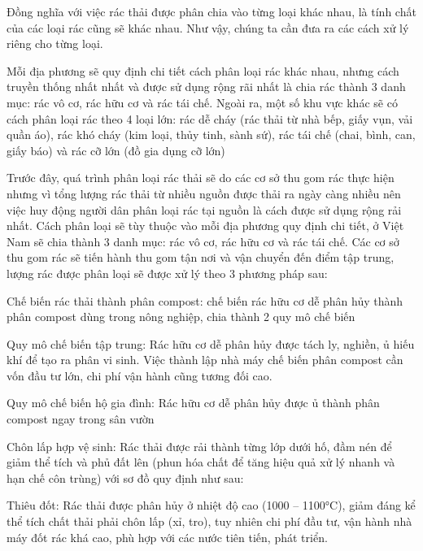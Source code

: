 
Đồng nghĩa với việc rác thải được phân chia vào từng loại khác nhau, là tính chất của các loại rác cũng sẽ khác nhau. Như vậy, chúng ta cần đưa ra các cách xử lý riêng cho từng loại.   

Mỗi địa phương sẽ quy định chi tiết cách phân loại rác khác nhau, nhưng cách truyền thống nhất nhất và được sử dụng rộng rãi nhất là chia rác thành 3 danh mục: rác vô cơ, rác hữu cơ và rác tái chế.
Ngoài ra, một số khu vực khác sẽ có cách phân loại rác theo 4 loại lớn: rác dễ cháy (rác thải từ nhà bếp, giấy vụn, vải quần áo), rác khó cháy (kim loại, thủy tinh, sành sứ), rác tái chế (chai, bình, can, giấy báo) và rác cỡ lớn (đồ gia dụng cỡ lớn)

Trước đây, quá trình phân loại rác thải sẽ do các cơ sở thu gom rác thực hiện nhưng vì tổng lượng rác thải từ nhiều nguồn được thải ra ngày càng nhiều nên việc huy động người dân phân loại rác tại nguồn là cách được sử dụng rộng rải nhất. Cách phân loại sẽ tùy thuộc vào mỗi địa phương quy định chi tiết, ở Việt Nam sẽ chia thành 3 danh mục: rác vô cơ, rác hữu cơ và rác tái chế. Các cơ sở thu gom rác sẽ tiến hành thu gom tận nơi và vận chuyển đến điểm tập trung, lượng rác được phân loại sẽ được xử lý theo 3 phương pháp sau:
 
Chế biến rác thải thành phân compost: chế biến rác hữu cơ dễ phân hủy thành phân compost dùng trong nông nghiệp, chia thành 2 quy mô chế biến

Quy mô chế biến tập trung: Rác hữu cơ dễ phân hủy được tách ly, nghiền, ủ hiếu khí để tạo ra phân vi sinh. Việc thành lập nhà máy chế biến phân compost cần vốn đầu tư lớn, chi phí vận hành cũng tương đối cao.

Quy mô chế biến hộ gia đình: Rác hữu cơ dễ phân hủy được ủ thành phân compost ngay trong sân vườn

Chôn lấp hợp vệ sinh: Rác thải được rải thành từng lớp dưới hố, đầm nén để giảm thể tích và phủ đất lên (phun  hóa chất để tăng hiệu quả xử lý nhanh và hạn chế côn trùng) với sơ đồ quy định như sau:


Thiêu đốt: Rác thải được phân hủy ở nhiệt độ cao (1000 – 1100°C), giảm đáng kể thể tích chất thải phải chôn lấp (xỉ, tro), tuy nhiên chi phí đầu tư, vận hành nhà máy đốt rác khá cao, phù hợp với các nước tiên tiến, phát triển. 

